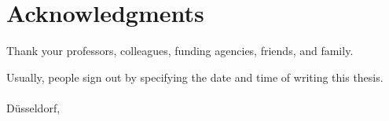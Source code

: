 \titleformat{\chapter}[hang]{\huge\bfseries}{\thechapter}{1em}{}
\titlespacing{\chapter}{0pt}{0pt}{1cm}

\chapter{Acknowledgments}

Thank your professors, colleagues, funding agencies, friends, and family.
\par
Usually, people sign out by specifying the date and time of writing this thesis.\\\\
D\"usseldorf, \date{\today}
